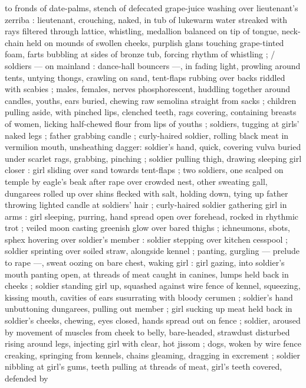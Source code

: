 \documentclass[10pt,twoside]{memoir}
\begin{document}
to fronds of date-palms, stench of defecated grape-juice washing 
over lieutenant's zerriba : lieutenant, crouching, naked, in tub of 
lukewarm water streaked with rays filtered through lattice, whistling, 
medallion balanced on tip of tongue, neck-chain held on mounds of 
swollen cheeks, purplish glans touching grape-tinted foam, farts 
bubbling at sides of bronze tub, forcing rhythm of whistling ; / 
soldiers --- on mainland : dance-hall bouncers ---, in fading light, 
prowling around tents, untying thongs, crawling on sand, tent-flaps 
rubbing over backs riddled with scabies ; males, females, nerves 
phosphorescent, huddling together around candles, youths, ears 
buried, chewing raw semolina straight from sacks ; children pulling 
aside, with pinched lips, clenched teeth, rags covering, containing 
breasts of women, licking half-chewed flour from lips of youths ; 
soldiers, tugging at girls' naked legs ; father grabbing candle ; curly-haired 
soldier, rolling black meat in vermilion mouth, unsheathing 
dagger: soldier's hand, quick, covering vulva buried under scarlet 
rags, grabbing, pinching ; soldier pulling thigh, drawing sleeping girl 
closer : girl sliding over sand towards tent-flaps ; two soldiers, one 
scalped on temple by eagle's beak after rape over crowded nest, 
other sweating gall, dungarees rolled up over shins flecked with salt, 
holding down, tying up father throwing lighted candle at soldiers' 
hair ; curly-haired soldier gathering girl in arms : girl sleeping, 
purring, hand spread open over forehead, rocked in rhythmic trot ; 
veiled moon casting greenish glow over bared thighs ; ichneumons, 
sbots, sphex hovering over soldier's member : soldier stepping over 
kitchen cesspool ; soldier sprinting over soiled straw, alongside 
kennel ; panting, gurgling --- prelude to rape ---, sweat oozing on 
bare chest, waking girl : girl gazing, into soldier's mouth panting 
open, at threads of meat caught in canines, lumps held back in 
cheeks ; soldier standing girl up, squashed against wire fence of 
kennel, squeezing, kissing mouth, cavities of ears susurrating with 
bloody cerumen ; soldier's hand unbuttoning dungarees, pulling out 
member ; girl sucking up meat held back in soldier's cheeks, 
chewing, eyes closed, hands spread out on fence ; soldier, aroused 
by movement of muscles from cheek to belly, bare-headed, strawdust 
disturbed rising around legs, injecting girl with clear, hot jissom 
; dogs, woken by wire fence creaking, springing from kennels, chains 
gleaming, dragging in excrement ; soldier nibbling at girl's gums, 
teeth pulling at threads of meat, girl's teeth covered, defended by 
\end{document}
